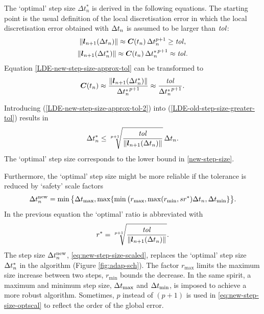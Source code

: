 The `optimal' step size
$\Delta t_n^*$ is derived in the following equations. The starting point is
the usual definition of the local discretisation error in which the local discretisation error obtained with $\Delta t_n$ is
assumed to be larger than $\mathit{tol}$:
\begin{gather}
  \label{LDE-old-step-size-greater-tol}
  \| \boldsymbol{l}_{n+1}(\Delta t_n) \|
  \approx \boldsymbol{C}(t_n)\, \Delta t_n^{p+1} 
  \geq \mathit{tol}
  \text{,}
\\
  \label{LDE-new-step-size-approx-tol}
  \| \boldsymbol{l}_{n+1}(\Delta t_n^*) \|
  \approx \boldsymbol{C}(t_n)\, {\Delta t_n^*}^{p+1} 
  \approx \mathit{tol}
  \text{.}
\end{gather}
Equation \eqref{LDE-new-step-size-approx-tol} can be transformed to
\begin{equation} \label{LDE-new-step-size-approx-tol-2}
  \boldsymbol{C}(t_n)
  \approx \frac{\| \boldsymbol{l}_{n+1}(\Delta t_n^*) \|}{{\Delta
  t_n^*}^{p+1}}
  \approx \frac{\mathit{tol}}{{\Delta t_n^*}^{p+1}}
  \text{.}
\end{equation}

Introducing (\ref{LDE-new-step-size-approx-tol-2}) into
(\ref{LDE-old-step-size-greater-tol}) results in
\begin{equation}\label{new-step-size}
  \Delta t_n^* \leq \sqrt[{p+1}]{\frac{\mathit{tol}}{\|
  \boldsymbol{l}_{n+1}(\Delta t_n) \|}}\, \Delta t_n
  \text{.}
\end{equation}
The `optimal' step size corresponds to the lower bound in
\eqref{new-step-size}\@. 

Furthermore, the `optimal' step size might be more reliable if the
tolerance is reduced by `safety' scale factors
\begin{equation}\label{eq:new-step-size-scaled}
  \Delta t_n^\text{new}
  = \min\big\{ \Delta t_\text{max}, \max\{\min\big( r_\text{max}, \max(
  r_\text{min}, s r^*)\Delta t_n, \Delta t_\text{min} \} \big\}
  \text{.}
\end{equation}
In the previous equation the `optimal' ratio is abbreviated with
\begin{equation}\label{eq:new-step-size-optscal}
  r^* = \sqrt[{p+1}]{\frac{\mathit{tol}}{\|
  \boldsymbol{l}_{n+1}(\Delta t_n) \|}}
  \text{.}
\end{equation}
The step size $\Delta t_n^\text{new}$,  \eqref{eq:new-step-size-scaled},
replaces the `optimal' step size $\Delta t_n^*$ in 
the algorithm (Figure \ref{fig:adap-sch})\@. The factor $r_\text{max}$
limits the maximum size increase between two steps, $r_\text{min}$ bounds the
decrease. 
In the same spirit, a
maximum and minimum step size, $\Delta t_\text{max}$ and $\Delta t_\text{min}$, is
imposed to achieve a more robust algorithm. Sometimes, $p$ instead of $(p+1)$
is 
used in \eqref{eq:new-step-size-optscal} to reflect the order of the
global error. 
\newline

